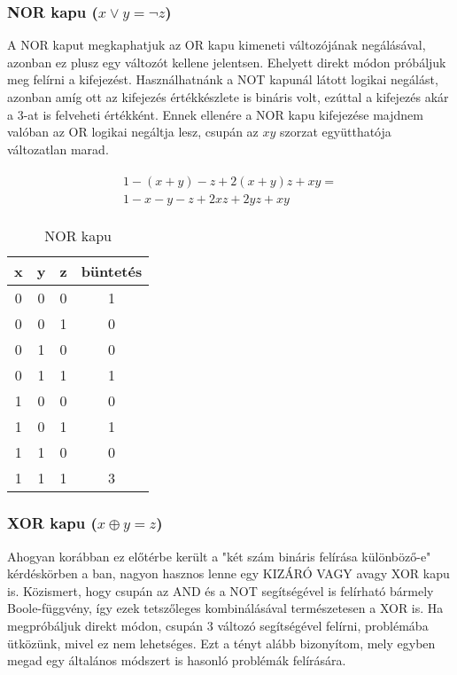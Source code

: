 \subsubsection{NOR kapu ($x \vee y = \neg z$)}

A NOR kaput megkaphatjuk az OR kapu kimeneti változójának negálásával, azonban ez plusz egy változót kellene jelentsen. Ehelyett direkt módon próbáljuk meg felírni a kifejezést. Használhatnánk a NOT kapunál látott logikai negálást, azonban amíg ott az kifejezés értékkészlete is bináris volt, ezúttal a kifejezés akár a $3$-at is felveheti értékként. Ennek ellenére a NOR kapu kifejezése majdnem valóban az OR logikai negáltja lesz, csupán az $xy$ szorzat együtthatója változatlan marad.


\begin{align}
\begin{split}
	1-(x+y)-z+2(x+y)z+xy = \\
	 1-x-y-z+2xz+2yz+xy
\end{split}
\end{align}

\begin{table}[ht]
	\footnotesize
	\centering
	\begin{tabular}{ c c c c }
		\toprule
		x & y & z & büntetés \\
		\midrule
		0 & 0 & 0 & 1 \\
		0 & 0 & 1 & 0 \\
		0 & 1 & 0 & 0 \\
		0 & 1 & 1 & 1 \\
		1 & 0 & 0 & 0 \\
		1 & 0 & 1 & 1 \\
		1 & 1 & 0 & 0 \\
		1 & 1 & 1 & 3 \\		
		\bottomrule
	\end{tabular}
	\caption{NOR kapu}
	\label{tab:NORgate}
\end{table}

\subsubsection{XOR kapu ($x \oplus y = z$)} \label{sec:XORgate}

Ahogyan korábban ez előtérbe került a "két szám bináris felírása különböző-e" kérdéskörben a ban, nagyon hasznos lenne egy KIZÁRÓ VAGY avagy XOR kapu is. Közismert, hogy csupán az AND és a NOT segítségével is felírható bármely Boole-függvény, így ezek tetszőleges kombinálásával természetesen a XOR is.
Ha megpróbáljuk direkt módon, csupán 3 változó segítségével felírni, problémába ütközünk, mivel ez nem lehetséges. Ezt a tényt alább bizonyítom, mely egyben megad egy általános módszert is hasonló problémák felírására.

